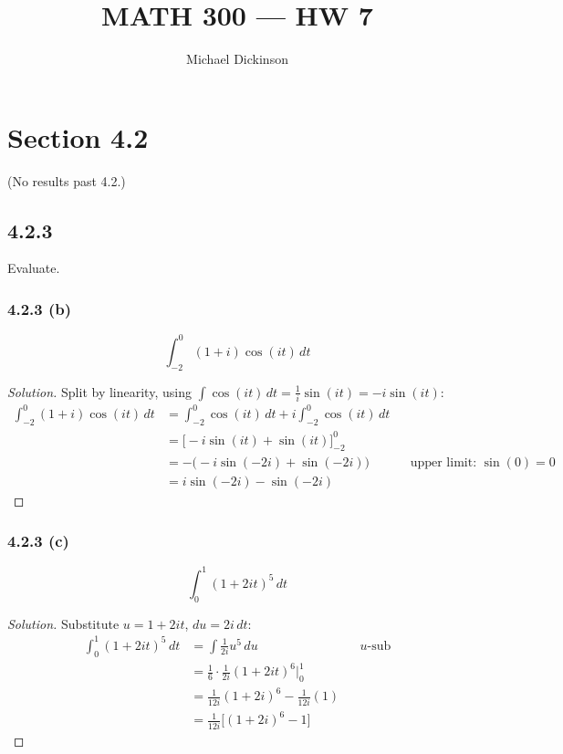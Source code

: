 \documentclass{article}
\title{MATH 300 --- HW 7}
\author{Michael Dickinson}
\date{}
\newenvironment{solution}{
\begin{proof}[Solution]}{
\end{proof}}
\begin{document}
\maketitle

\section*{Section 4.2}
(No results past 4.2.)

\subsection*{4.2.3}
Evaluate.

\subsubsection*{4.2.3 (b)}
\[ \int_{-2}^{0} (1+i)\cos(it)\,dt \]
\begin{solution}
  Split by linearity, using $\int\cos(it)\,dt = \tfrac{1}{i}\sin(it) = -i\sin(it)$:
  \begin{align*}
    \int_{-2}^{0}(1+i)\cos(it)\,dt
    & = \int_{-2}^{0} \cos(it)\,dt + i\int_{-2}^{0} \cos(it)\,dt \\
    & = \Big[-i\sin(it) + \sin(it)\Big]_{-2}^{0} \\
    & = -\big(-i\sin(-2i) + \sin(-2i)\big)
      && \text{upper limit: } \sin(0)=0 \\
    & = i\sin(-2i) - \sin(-2i)
  \end{align*}
\end{solution}

\subsubsection*{4.2.3 (c)}
\[ \int_{0}^{1} (1+2it)^5\,dt \]
\begin{solution}
  Substitute $u = 1+2it$, $du = 2i\,dt$:
  \begin{align*}
    \int_0^1 (1+2it)^5\,dt
    & = \int \frac{1}{2i}u^5\,du && \text{$u$-sub} \\
    & = \frac{1}{6}\cdot\frac{1}{2i}(1+2it)^6 \Big|_0^1 \\
    & = \frac{1}{12i}(1+2i)^6 - \frac{1}{12i}(1) \\
    & = \frac{1}{12i}\Big[(1+2i)^6 - 1\Big]
  \end{align*}
\end{solution}
\end{document}
